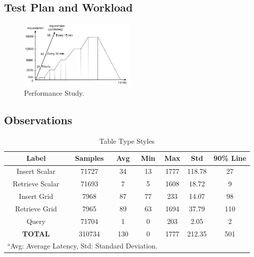 \documentclass[conference]{IEEEtran}
\begin{document}
\subsection{Test Plan and Workload}
\begin{figure}[htbp]
\centerline{\includegraphics[width=0.5\textwidth]{results/work_load/performance_study_v4.jpg}}
\caption{Performance Study.}
\label{fi:performance_Study}
\end{figure}

\subsection{Observations}
\begin{table}[htbp]
\caption{Table Type Styles}
\begin{center}
\begin{tabular}{|c|c|c|c|c|c|c|}
\hline
\textbf{Label} & \textbf{Samples} & \textbf{Avg} & \textbf{Min} & \textbf{Max} & \textbf{Std} & \textbf{90\% Line} \\ \hline
Insert Scalar & 71727 & 34 & 13 & 1777 & 118.78 & 27 \\ \hline
Retrieve Scalar & 71693 & 7 & 5 & 1608 & 18.72 & 9 \\ \hline
Insert Grid & 7968 & 87 & 77 & 233 & 14.07 & 98 \\ \hline
Retrieve Grid & 7965 & 89 & 63 & 1694 & 37.79 & 110 \\ \hline
Query & 71704 & 1 & 0 & 203 & 2.05 & 2 \\ \hline
\textbf{TOTAL} & 310734 & 130 & 0 & 1777 & 212.35 & 501 \\ \hline
\multicolumn{4}{l}{$^{\mathrm{a}}$Avg: Average Latency, Std: Standard Deviation.}
\end{tabular}
\label{tab:obs_all_auto_15_min_summary_latency}
\end{center}
\end{table}
\end{document}
